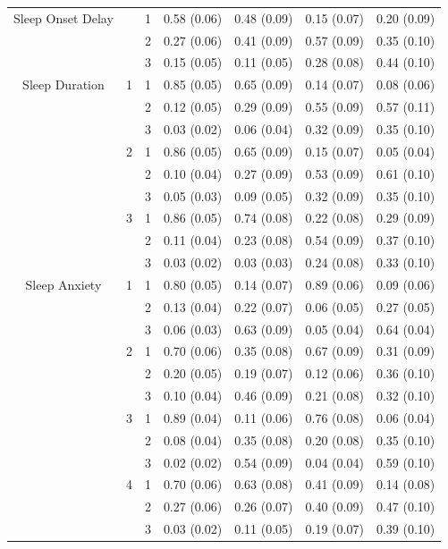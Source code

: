 \documentclass[11pt]{article}
\theoremstyle{plain}
\theoremstyle{definition}
\begin{document}
\begin{longtable}{clccccc}
Sleep Onset Delay & & 1 & 0.58 (0.06) &  0.48  (0.09) & 0.15  (0.07) & 0.20 (0.09)\\
 & & 2 & 0.27 (0.06) &  0.41  (0.09) & 0.57  (0.09) & 0.35 (0.10)\\
 & & 3 & 0.15 (0.05) &  0.11  (0.05) &  0.28 (0.08) & 0.44 (0.10)\\
 
Sleep Duration  & 1 & 1  & 0.85 (0.05) &  0.65  (0.09) &  0.14 (0.07) & 0.08 (0.06)\\
 & & 2  & 0.12 (0.05) &  0.29  (0.09) &  0.55 (0.09) & 0.57 (0.11)\\
 & & 3  & 0.03 (0.02) &  0.06  (0.04) &  0.32 (0.09) & 0.35 (0.10)\\
  & 2 & 1  & 0.86 (0.05) &  0.65  (0.09) &  0.15 (0.07) & 0.05 (0.04)\\
 & & 2  & 0.10 (0.04) &  0.27  (0.09) & 0.53  (0.09) & 0.61 (0.10)\\
 & & 3  & 0.05 (0.03) &  0.09  (0.05) &  0.32 (0.09) & 0.35 (0.10)\\
   & 3 & 1  & 0.86 (0.05) &  0.74  (0.08) &  0.22 (0.08) & 0.29 (0.09)\\
 & & 2  & 0.11 (0.04) &  0.23  (0.08) &  0.54 (0.09) & 0.37 (0.10)\\
 & & 3  & 0.03 (0.02) &  0.03  (0.03) & 0.24  (0.08) & 0.33 (0.10)\\
 
 Sleep Anxiety  & 1 & 1  & 0.80 (0.05) &  0.14  (0.07) & 0.89  (0.06) & 0.09 (0.06) \\
 & & 2  & 0.13 (0.04) &  0.22  (0.07) &  0.06 (0.05) & 0.27 (0.05) \\
 & & 3  & 0.06 (0.03) &   0.63 (0.09) &  0.05 (0.04) & 0.64 (0.04) \\
  & 2 & 1  & 0.70 (0.06) &  0.35  (0.08) & 0.67  (0.09) & 0.31 (0.09) \\
 & & 2  & 0.20 (0.05) &  0.19  (0.07) &  0.12 (0.06) & 0.36 (0.10)\\
 & & 3  & 0.10 (0.04) &  0.46  (0.09) &  0.21 (0.08) & 0.32 (0.10)\\
   & 3 & 1  & 0.89 (0.04) &   0.11 (0.06) &  0.76 (0.08) & 0.06 (0.04)\\
 & & 2  & 0.08 (0.04) &  0.35  (0.08) &  0.20 (0.08) & 0.35 (0.10)\\
 & & 3  & 0.02 (0.02) &  0.54  (0.09) &  0.04 (0.04) & 0.59 (0.10)\\
    & 4 & 1  & 0.70 (0.06) &  0.63  (0.08) &  0.41  (0.09) & 0.14 (0.08) \\
 & & 2  & 0.27 (0.06) &  0.26  (0.07) & 0.40  (0.09) & 0.47 (0.10)  \\
 & & 3  & 0.03 (0.02) &  0.11  (0.05) & 0.19  (0.07) & 0.39 (0.10) \\
 

\end{longtable}
\end{document}
